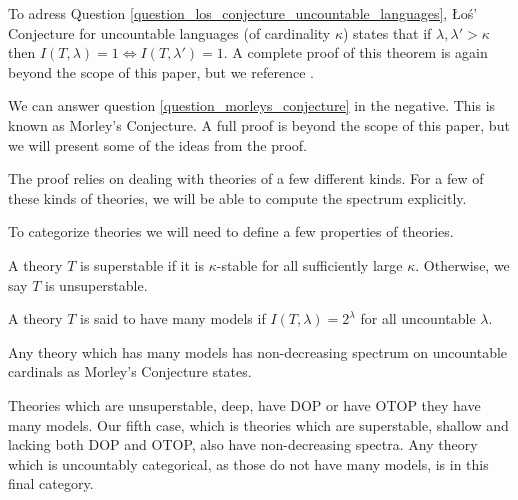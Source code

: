 
To adress Question \ref{question_los_conjecture_uncountable_languages}, \L o\'s' Conjecture for uncountable languages (of cardinality \(\kappa\)) states that if \(\lambda, \lambda' >\kappa\) then \(I(T, \lambda) = 1 \iff I(T, \lambda') = 1\). 
A complete proof of this theorem is again beyond the scope of this paper, but we reference \cite{shelahUncountable}.

We can answer question \ref{question_morleys_conjecture} in the negative. This is known as Morley's Conjecture. A full proof is beyond the scope of this paper, but we will present some of the ideas from the proof. 

The proof relies on dealing with theories of a few different kinds.\cite{hart}
For a few of these kinds of theories, we will be able to compute the spectrum explicitly.

To categorize theories we will need to define a few properties of theories. 

\begin{definition}\label{definition_superstable}
A theory \(T\) is superstable if it is \(\kappa\)-stable for all sufficiently large \(\kappa\). Otherwise, we say \(T\) is unsuperstable. 
\end{definition}

%
%
%
%

\begin{definition}\label{definition_many_models}
A theory \(T\) is said to have many models if \(I(T, \lambda) = 2^\lambda\) for all uncountable \(\lambda\). 
\end{definition}

Any theory which has many models has non-decreasing spectrum on uncountable cardinals as Morley's Conjecture states. 

Theories which are unsuperstable, deep, have DOP or have OTOP they have many models. 
Our fifth case, which is theories which are superstable, shallow and lacking both DOP and OTOP, also have non-decreasing spectra. 
Any theory which is uncountably categorical, as those do not have many models, is in this final category. 





